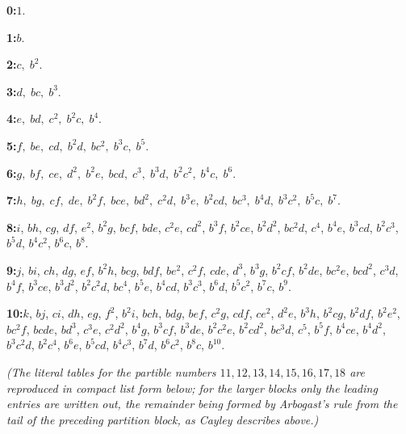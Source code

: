 \documentclass[11pt,a4paper]{article}
\begin{document}
\medskip

\noindent\textbf{0:}\quad $1$.

\smallskip
\noindent\textbf{1:}\quad $b$.

\smallskip
\noindent\textbf{2:}\quad $c,\;b^{2}$.

\smallskip
\noindent\textbf{3:}\quad $d,\;bc,\;b^{3}$.

\smallskip
\noindent\textbf{4:}\quad $e,\;bd,\;c^{2},\;b^{2}c,\;b^{4}$.

\smallskip
\noindent\textbf{5:}\quad $f,\;be,\;cd,\;b^{2}d,\;bc^{2},\;b^{3}c,\;b^{5}$.

\smallskip
\noindent\textbf{6:}\quad $g,\;bf,\;ce,\;d^{2},\;b^{2}e,\;bcd,\;c^{3},\;b^{3}d,\;b^{2}c^{2},\;b^{4}c,\;b^{6}$.

\smallskip
\noindent\textbf{7:}\quad $h,\;bg,\;cf,\;de,\;b^{2}f,\;bce,\;bd^{2},\;c^{2}d,\;b^{3}e,\;b^{2}cd,\;bc^{3},\;b^{4}d,\;b^{3}c^{2},\;b^{5}c,\;b^{7}$.

\smallskip
{\sloppy
\noindent\textbf{8:}\quad $i$, $bh$, $cg$, $df$, $e^{2}$, $b^{2}g$, $bcf$, $bde$, $c^{2}e$, $cd^{2}$, $b^{3}f$, $b^{2}ce$, $b^{2}d^{2}$, $bc^{2}d$, $c^{4}$, $b^{4}e$, $b^{3}cd$, $b^{2}c^{3}$, $b^{5}d$, $b^{4}c^{2}$, $b^{6}c$, $b^{8}$.

\smallskip
\noindent\textbf{9:}\quad $j$, $bi$, $ch$, $dg$, $ef$, $b^{2}h$, $bcg$, $bdf$, $be^{2}$, $c^{2}f$, $cde$, $d^{3}$, $b^{3}g$, $b^{2}cf$, $b^{2}de$, $bc^{2}e$, $bcd^{2}$, $c^{3}d$, $b^{4}f$, $b^{3}ce$, $b^{3}d^{2}$, $b^{2}c^{2}d$, $bc^{4}$, $b^{5}e$, $b^{4}cd$, $b^{3}c^{3}$, $b^{6}d$, $b^{5}c^{2}$, $b^{7}c$, $b^{9}$.

\smallskip
\noindent\textbf{10:}\quad $k$, $bj$, $ci$, $dh$, $eg$, $f^{2}$, $b^{2}i$, $bch$, $bdg$, $bef$, $c^{2}g$, $cdf$, $ce^{2}$, $d^{2}e$, $b^{3}h$, $b^{2}cg$, $b^{2}df$, $b^{2}e^{2}$, $bc^{2}f$, $bcde$, $bd^{3}$, $c^{3}e$, $c^{2}d^{2}$, $b^{4}g$, $b^{3}cf$, $b^{3}de$, $b^{2}c^{2}e$, $b^{2}cd^{2}$, $bc^{3}d$, $c^{5}$, $b^{5}f$, $b^{4}ce$, $b^{4}d^{2}$, $b^{3}c^{2}d$, $b^{2}c^{4}$, $b^{6}e$, $b^{5}cd$, $b^{4}c^{3}$, $b^{7}d$, $b^{6}c^{2}$, $b^{8}c$, $b^{10}$.
\par}

\medskip
\noindent\textit{(The literal tables for the partible numbers $11,12,13,14,15,16,17,18$ are reproduced in compact list form below; for the larger blocks only the leading entries are written out, the remainder being formed by Arbogast's rule from the tail of the preceding partition block, as Cayley describes above.)}
\end{document}
